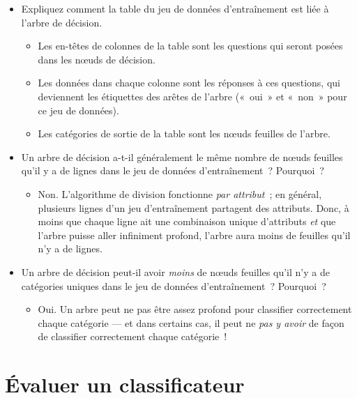 \documentclass[12pt,a4paper]{article}
\begin{document}
\begin{thinkbox}
  \begin{itemize}
    \item Expliquez comment la table du jeu de données d'entraînement est liée à l'arbre de décision.
    \begin{itemize}
      \item Les en-têtes de colonnes de la table sont les questions qui seront posées dans les nœuds de décision.
      \item Les données dans chaque colonne sont les réponses à ces questions, qui deviennent les étiquettes des arêtes de l'arbre («~oui~» et «~non~» pour ce jeu de données).
      \item Les catégories de sortie de la table sont les nœuds feuilles de l'arbre.
    \end{itemize}
    \item Un arbre de décision a-t-il généralement le même nombre de nœuds feuilles qu'il y a de lignes dans le jeu de données d'entraînement~? Pourquoi~?
    \begin{itemize}
      \item Non. L'algorithme de division fonctionne \emph{par attribut}~; en général, plusieurs lignes d'un jeu d'entraînement partagent des attributs. Donc, à moins que chaque ligne ait une combinaison unique d'attributs \emph{et} que l'arbre puisse aller infiniment profond, l'arbre aura moins de feuilles qu'il n'y a de lignes.
    \end{itemize}
    \item Un arbre de décision peut-il avoir \emph{moins} de nœuds feuilles qu'il n'y a de catégories uniques dans le jeu de données d'entraînement~? Pourquoi~?
    \begin{itemize}
      \item Oui. Un arbre peut ne pas être assez profond pour classifier correctement chaque catégorie — et dans certains cas, il peut ne \emph{pas y avoir} de façon de classifier correctement chaque catégorie~!
    \end{itemize}
  \end{itemize}
\end{thinkbox}

\newpage

\section{Évaluer un classificateur}
\end{document}
